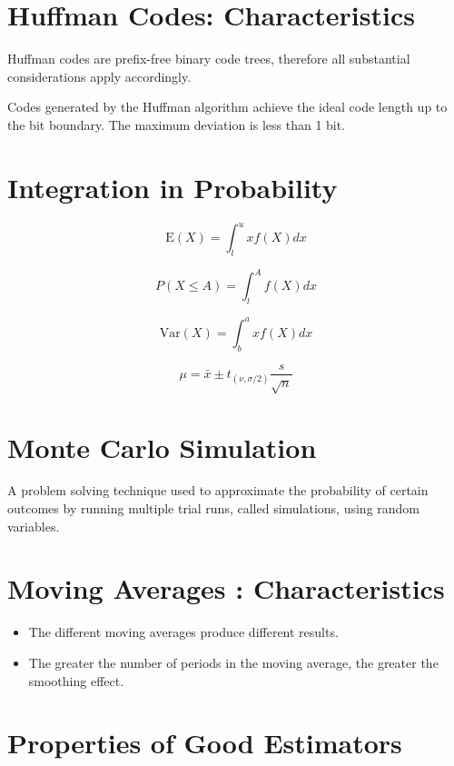 \begin{enumerate}
\section{Huffman Codes: Characteristics}

Huffman codes are prefix-free binary code trees, therefore all substantial considerations apply accordingly.

Codes generated by the Huffman algorithm achieve the ideal code length up to the bit boundary.
The maximum deviation is less than 1 bit.
\section{Integration in Probability}

\[ \mbox{E}(X) = \int^{u}_{l} x f(X) dx \]

\[ P(X \leq A)  = \int^{A}_{l} f(X) dx \]

\[ \mbox{Var}(X) = \int^{a}_{b} x f(X) dx \]


\[ \mu = \bar{x} \pm t_{(\nu,\sigma/2)}\frac{s}{\sqrt{n}}  \]




\section{Monte Carlo Simulation}

A problem solving technique used to approximate the probability of certain outcomes by running multiple trial runs, called simulations, using random variables.
\section{ Moving Averages : Characteristics}
\begin{itemize}
	\item The different moving averages produce different results.
	\item The greater the number of periods in the moving average, the greater the smoothing effect.
\end{itemize}


\section{Properties of Good Estimators}


\end{enumerate}

